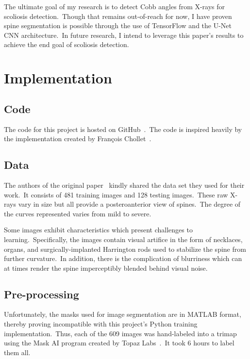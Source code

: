 \documentclass[conference]{IEEEtran}
\begin{document}
    The ultimate goal of my research is to detect Cobb angles from X-rays for scoliosis detection.\ Though that remains out-of-reach for now, I have proven spine segmentation is possible through the use of TensorFlow and the U-Net CNN architecture.\ In future research, I intend to leverage this paper's results to achieve the end goal of scoliosis detection.

    \section{Implementation}\label{sec:implementation}

    \subsection{Code}\label{subsec:code}

    The code for this project is hosted on GitHub~\cite{spine-segmentation}.\ The code is inspired heavily by the implementation created by François Chollet~\cite{image-segmentation-with-a-u-net-like-architecture}.

    \subsection{Data}\label{subsec:data}

    The authors of the original paper~\cite{cobb-angle-measurement-of-spine-from-x-ray-images-using-convolutional-neural-network} kindly shared the data set they used for their work.\ It consists of 481 training images and 128 testing images.\ These raw X-rays vary in size but all provide a posteroanterior view of spines.\ The degree of the curves represented varies from mild to severe.

    Some images exhibit characteristics which present challenges to learning.\ Specifically, the images contain visual artifice in the form of necklaces, organs, and surgically-implanted Harrington rods used to stabilize the spine from further curvature.\ In addition, there is the complication of blurriness which can at times render the spine imperceptibly blended behind visual noise.

    \subsection{Pre-processing}\label{subsec:pre-processing}

    Unfortunately, the masks used for image segmentation are in MATLAB format, thereby proving incompatible with this project's Python training implementation.\ Thus, each of the 609 images was hand-labeled into a trimap~\cite{create-trimaps-with-topaz-mask-ai} using the Mask AI program created by Topaz Labs~\cite{topaz-mask-ai}.\ It took 6 hours to label them all.
\end{document}
